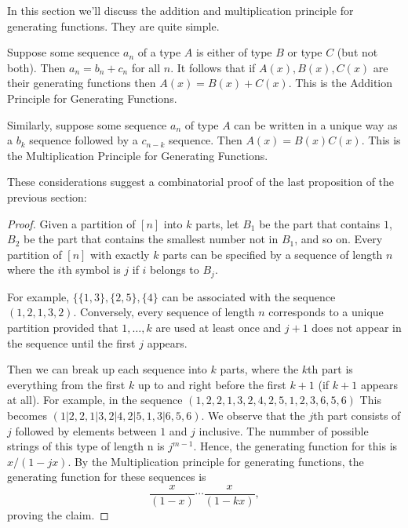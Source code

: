 In this section we'll discuss the addition and multiplication principle for generating functions. They are quite simple.

Suppose some sequence $a_n$ of a type $A$ is either of type $B$ or type $C$ (but not both). Then $a_n = b_n + c_n$ for all $n$. It follows that if $A(x), B(x), C(x)$ are their generating functions then $A(x) = B(x) + C(x)$. This is the Addition Principle for Generating Functions.

Similarly, suppose some sequence $a_n$ of type $A$ can be written in a unique way as a $b_k$ sequence followed by a $c_{n-k}$ sequence. Then $A(x) = B(x)C(x)$. This is the Multiplication Principle for Generating Functions.

These considerations suggest a combinatorial proof of the last proposition of the previous section:
\begin{proof}
Given a partition of $[n]$ into $k$ parts, let $B_1$ be the part that contains $1$, $B_2$ be the part that contains the smallest number not in $B_1$, and so on. Every partition of $[n]$ with exactly $k$ parts can be specified by a sequence of length $n$ where the $i$th symbol is $j$ if $i$ belongs to $B_j$. 

For example, $\{\{1, 3\}, \{2, 5\}, \{4\}$ can be associated with the sequence $(1, 2, 1, 3, 2)$. Conversely, every sequence of length $n$ corresponds to a unique partition provided that $1, \dots, k$ are used at least once and $j+1$ does not appear in the sequence until the first $j$ appears.

Then we can break up each sequence into $k$ parts, where the $k$th part is everything from the first $k$ up to and right before the first $k + 1$ (if $k + 1$ appears at all). For example, in the sequence $(1, 2, 2, 1, 3, 2, 4, 2, 5, 1, 2, 3, 6, 5, 6)$ This becomes $(1 | 2, 2, 1 | 3, 2 | 4, 2 | 5, 1, 3 | 6, 5, 6)$. We observe that the $j$th part consists of $j$ followed by elements between $1$ and $j$ inclusive.  The nummber of possible strings of this type of length n is $j^{m-1}$. Hence, the generating function for this is $x/(1-jx)$. By the Multiplication principle for generating functions, the generating function for these sequences is 
\[\frac{x}{(1-x)}\cdots\frac{x}{(1-kx)},\] proving the claim.
\end{proof}